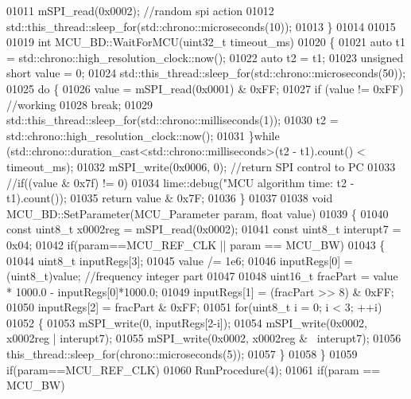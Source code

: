 \begin{DoxyCode}
{{{{{{01011     mSPI\_read(0x0002); \textcolor{comment}{//random spi action}
01012     std::this\_thread::sleep\_for(std::chrono::microseconds(10));
01013 \}
01014 
01015 
01019 \textcolor{keywordtype}{int} MCU\_BD::WaitForMCU(uint32\_t timeout_ms)
01020 \{
01021     \textcolor{keyword}{auto} t1 = std::chrono::high\_resolution\_clock::now();
01022     \textcolor{keyword}{auto} t2 = t1;
01023     \textcolor{keywordtype}{unsigned} \textcolor{keywordtype}{short} value = 0;
01024     std::this\_thread::sleep\_for(std::chrono::microseconds(50));
01025     \textcolor{keywordflow}{do} \{
01026         value = mSPI\_read(0x0001) & 0xFF;
01027         \textcolor{keywordflow}{if} (value != 0xFF) \textcolor{comment}{//working}
01028             \textcolor{keywordflow}{break};
01029         std::this\_thread::sleep\_for(std::chrono::milliseconds(1));
01030         t2 = std::chrono::high\_resolution\_clock::now();
01031     \}\textcolor{keywordflow}{while} (std::chrono::duration\_cast<std::chrono::milliseconds>(t2 - t1).count() < timeout\_ms);
01032     mSPI\_write(0x0006, 0); \textcolor{comment}{//return SPI control to PC}
01033     \textcolor{comment}{//if((value & 0x7f) != 0)}
01034     lime::debug(\textcolor{stringliteral}{"MCU algorithm time: %
      t2 - t1).count());
01035     \textcolor{keywordflow}{return} value & 0x7F;
01036 \}
01037 
01038 \textcolor{keywordtype}{void} MCU\_BD::SetParameter(MCU_Parameter param, \textcolor{keywordtype}{float} value)
01039 \{
01040     \textcolor{keyword}{const} uint8\_t x0002reg = mSPI\_read(0x0002);
01041     \textcolor{keyword}{const} uint8\_t interupt7 = 0x04;
01042     \textcolor{keywordflow}{if}(param==MCU_REF_CLK || param == MCU_BW)
01043     \{
01044         uint8\_t inputRegs[3];
01045         value /= 1e6;
01046         inputRegs[0] = (uint8\_t)value; \textcolor{comment}{//frequency integer part}
01047 
01048         uint16\_t fracPart = value * 1000.0 - inputRegs[0]*1000.0;
01049         inputRegs[1] = (fracPart >> 8) & 0xFF;
01050         inputRegs[2] = fracPart & 0xFF;
01051         \textcolor{keywordflow}{for}(uint8\_t i = 0; i < 3; ++i)
01052         \{
01053             mSPI\_write(0, inputRegs[2-i]);
01054             mSPI\_write(0x0002, x0002reg | interupt7);
01055             mSPI\_write(0x0002, x0002reg & ~interupt7);
01056             this\_thread::sleep\_for(chrono::microseconds(5));
01057         \}
01058     \}
01059     \textcolor{keywordflow}{if}(param==MCU_REF_CLK)
01060         RunProcedure(4);
01061     \textcolor{keywordflow}{if}(param == MCU_BW)
}}}}}}}
\end{DoxyCode}
